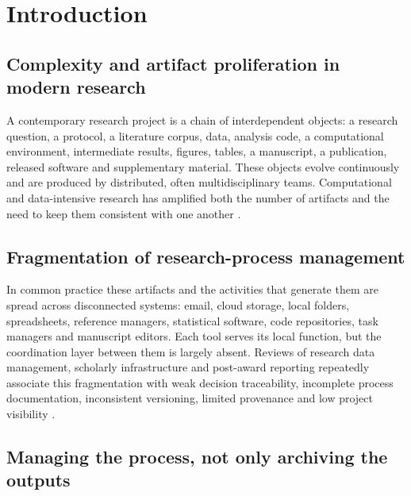 \documentclass[pdflatex,sn-mathphys-num]{sn-jnl}%
\begin{document}
\maketitle


\section{Introduction}\label{sec:intro}

\subsection{Complexity and artifact proliferation in modern research}\label{sec:complexity}

A contemporary research project is a chain of interdependent objects: a research question, a protocol, a literature corpus, data, analysis code, a computational environment, intermediate results, figures, tables, a manuscript, a publication, released software and supplementary material. These objects evolve continuously and are produced by distributed, often multidisciplinary teams. Computational and data-intensive research has amplified both the number of artifacts and the need to keep them consistent with one another \citep{liew2016,liu2015,mattoso2015}.

\subsection{Fragmentation of research-process management}\label{sec:fragmentation}

In common practice these artifacts and the activities that generate them are spread across disconnected systems: email, cloud storage, local folders, spreadsheets, reference managers, statistical software, code repositories, task managers and manuscript editors. Each tool serves its local function, but the coordination layer between them is largely absent. Reviews of research data management, scholarly infrastructure and post-award reporting repeatedly associate this fragmentation with weak decision traceability, incomplete process documentation, inconsistent versioning, limited provenance and low project visibility \citep{perrier2017,donner2022,crane2023,tutko2022}.

\subsection{Managing the process, not only archiving the outputs}\label{sec:process}
\end{document}
